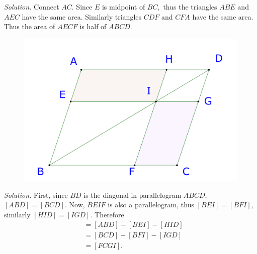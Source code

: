 \begin{multicols}{2}
	\textit{Solution.}
	Connect $AC.$ Since $E$ is midpoint of $BC,$ thus the triangles $ABE$ and $AEC$ have the same area.
	Similarly triangles $CDF$ and $CFA$ have the same area. Thus the area of $AECF$ is half of $ABCD.$
	\vskip 0.2cm
	\begin{figure}[H]
		\vspace*{-5pt}
		\centering
		\captionsetup{labelformat= empty, justification=centering}
		\includegraphics[width= 1\linewidth]{23-24-s3-i-p3.pdf}
		\vspace*{-10pt}
	\end{figure}
	\textit{Solution.}
	First, since $BD$ is the diagonal in parallelogram $ABCD,$ $[ABD] = [BCD].$
	Now, $BEIF$ is also a parallelogram, thus $[BEI] = [BFI],$ similarly $[HID] = [IGD].$
	Therefore 
	\begin{align*}
		[AEIH] &= [ABD] - [BEI] - [HID] \\
		&= [BCD] - [BFI] - [IGD] \\
		&= [FCGI].
	\end{align*}

\end{multicols}
